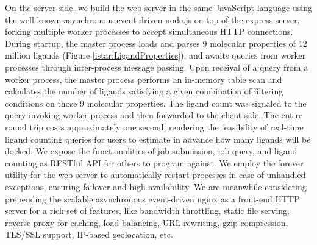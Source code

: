 On the server side, we build the web server in the same JavaScript language using the well-known asynchronous event-driven node.js on top of the express server, forking multiple worker processes to accept simultaneous HTTP connections. During startup, the master process loads and parses 9 molecular properties of 12 million ligands (Figure \ref{istar:LigandProperties}), and awaits queries from worker processes through inter-process message passing. Upon receival of a query from a worker process, the master process performs an in-memory table scan and calculates the number of ligands satisfying a given combination of filtering conditions on those 9 molecular properties. The ligand count was signaled to the query-invoking worker process and then forwarded to the client side. The entire round trip costs approximately one second, rendering the feasibility of real-time ligand counting queries for users to estimate in advance how many ligands will be docked. We expose the functionalities of job submission, job query, and ligand counting as RESTful API for others to program against. We employ the forever utility for the web server to automatically restart processes in case of unhandled exceptions, ensuring failover and high availability. We are meanwhile considering prepending the scalable asynchronous event-driven nginx as a front-end HTTP server for a rich set of features, like bandwidth throttling, static file serving, reverse proxy for caching, load balancing, URL rewriting, gzip compression, TLS/SSL support, IP-based geolocation, etc.

